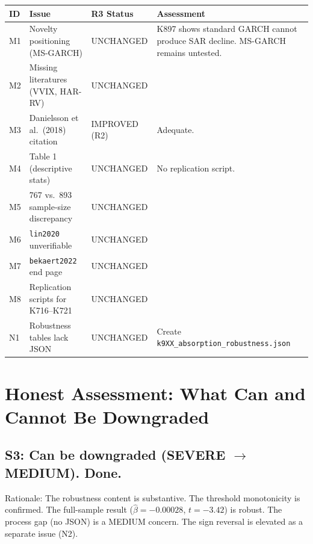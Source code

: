 \documentclass[12pt,a4paper]{article}
\begin{document}
\begin{longtable}{p{1cm}p{5cm}p{2.5cm}p{5.5cm}}
\toprule
\textbf{ID} & \textbf{Issue} & \textbf{R3 Status} & \textbf{Assessment} \\
\midrule
\endfirsthead
M1 & Novelty positioning (MS-GARCH) & \textcolor{warncolor}{UNCHANGED} & K897 shows standard GARCH cannot produce SAR decline. MS-GARCH remains untested. \\
\addlinespace
M2 & Missing literatures (VVIX, HAR-RV) & \textcolor{warncolor}{UNCHANGED} & \\
\addlinespace
M3 & Danielsson et al.\ (2018) citation & \textcolor{okgreen}{IMPROVED (R2)} & Adequate. \\
\addlinespace
M4 & Table 1 (descriptive stats) & \textcolor{warncolor}{UNCHANGED} & No replication script. \\
\addlinespace
M5 & 767 vs.\ 893 sample-size discrepancy & \textcolor{warncolor}{UNCHANGED} & \\
\addlinespace
M6 & \texttt{lin2020} unverifiable & \textcolor{warncolor}{UNCHANGED} & \\
\addlinespace
M7 & \texttt{bekaert2022} end page & \textcolor{warncolor}{UNCHANGED} & \\
\addlinespace
M8 & Replication scripts for K716--K721 & \textcolor{warncolor}{UNCHANGED} & \\
\addlinespace
N1 & Robustness tables lack JSON & \textcolor{warncolor}{UNCHANGED} & Create \texttt{k9XX\_absorption\_robustness.json} \\
\bottomrule
\end{longtable}


\bigskip

\section*{Honest Assessment: What Can and Cannot Be Downgraded}

\subsection*{S3: Can be downgraded (SEVERE $\to$ MEDIUM). Done.}

Rationale: The robustness content is substantive. The threshold monotonicity is confirmed. The full-sample result ($\hat{\beta} = -0.00028$, $t = -3.42$) is robust. The process gap (no JSON) is a MEDIUM concern. The sign reversal is elevated as a separate issue (N2).
\end{document}
